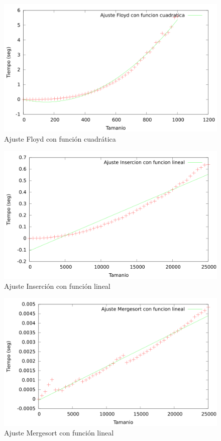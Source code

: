 \documentclass{article}
\begin{document}
	\begin{figure}[H]
		\centering
		\includegraphics[totalheight=8cm]{img/ajusteFloyd_cuadratico}
		\caption{Ajuste Floyd con función cuadrática}
		\label{fig:ajusteFloyd_cuadratico}
	\end{figure}
	
	\begin{figure}[H]
		\centering
		\includegraphics[totalheight=8cm]{img/ajusteInsercion_lineal}
		\caption{Ajuste Inserción con función lineal}
		\label{fig:ajusteInsercion_lineal}
	\end{figure}
	
	\begin{figure}[H]
		\centering
		\includegraphics[totalheight=8cm]{img/ajusteMergesort_lineal}
		\caption{Ajuste Mergesort con función lineal}
		\label{fig:ajusteMergesort_lineal}
	\end{figure}
	
\end{document}
